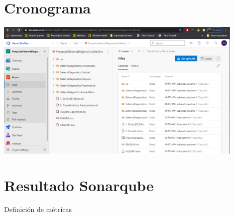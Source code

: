 \documentclass[preprint,12pt]{elsarticle}
\begin{document}
\section{Cronograma }

	\begin{center}
	\includegraphics[width=12cm]{./imagen/20} 
	\end{center}

\section{Resultado Sonarqube}
Definición de métricas
\end{document}

